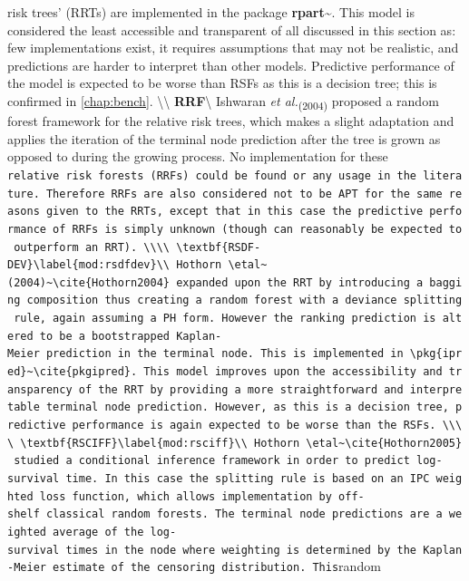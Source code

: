 \documentclass[
  letterpaper,
]{scrbook}
\theoremstyle{plain}
\theoremstyle{definition}
\theoremstyle{remark}
\begin{document}
risk trees' (RRTs) are implemented in the package
\textbf{rpart}\textasciitilde{}\cite{pkgrpart}. This model is considered
the least accessible and transparent of all discussed in this section
as: few implementations exist, it requires assumptions that may not be
realistic, and predictions are harder to interpret than other models.
Predictive performance of the model is expected to be worse than RSFs as
this is a decision tree; this is confirmed in \ref{chap:bench}.
\textbackslash\textbackslash{}
\textbf{RRF}\label{mod:rrf}\textbackslash{} Ishwaran
\textit{et al.}\textsubscript{(2004)}\cite{Ishwaran2004} proposed a
random forest framework for the relative risk trees, which makes a
slight adaptation and applies the iteration of the terminal node
prediction after the tree is grown as opposed to during the growing
process. No implementation for these
\texttt{relative\ risk\ forests\textquotesingle{}\ (RRFs)\ could\ be\ found\ or\ any\ usage\ in\ the\ literature.\ Therefore\ RRFs\ are\ also\ considered\ not\ to\ be\ APT\ for\ the\ same\ reasons\ given\ to\ the\ RRTs,\ except\ that\ in\ this\ case\ the\ predictive\ performance\ of\ RRFs\ is\ simply\ unknown\ (though\ can\ reasonably\ be\ expected\ to\ outperform\ an\ RRT).\ \textbackslash{}\textbackslash{}\textbackslash{}\textbackslash{}\ \textbackslash{}textbf\{RSDF-DEV\}\textbackslash{}label\{mod:rsdfdev\}\textbackslash{}\textbackslash{}\ Hothorn\ \textbackslash{}etal\textasciitilde{}(2004)\textasciitilde{}\textbackslash{}cite\{Hothorn2004\}\ expanded\ upon\ the\ RRT\ by\ introducing\ a\ bagging\ composition\ thus\ creating\ a\ random\ forest\ with\ a\ deviance\ splitting\ rule,\ again\ assuming\ a\ PH\ form.\ However\ the\ ranking\ prediction\ is\ altered\ to\ be\ a\ bootstrapped\ Kaplan-Meier\ prediction\ in\ the\ terminal\ node.\ This\ is\ implemented\ in\ \textbackslash{}pkg\{ipred\}\textasciitilde{}\textbackslash{}cite\{pkgipred\}.\ This\ model\ improves\ upon\ the\ accessibility\ and\ transparency\ of\ the\ RRT\ by\ providing\ a\ more\ straightforward\ and\ interpretable\ terminal\ node\ prediction.\ However,\ as\ this\ is\ a\ decision\ tree,\ predictive\ performance\ is\ again\ expected\ to\ be\ worse\ than\ the\ RSFs.\ \textbackslash{}\textbackslash{}\textbackslash{}\textbackslash{}\ \textbackslash{}textbf\{RSCIFF\}\textbackslash{}label\{mod:rsciff\}\textbackslash{}\textbackslash{}\ Hothorn\ \textbackslash{}etal\textasciitilde{}\textbackslash{}cite\{Hothorn2005\}\ studied\ a\ conditional\ inference\ framework\ in\ order\ to\ predict\ log-survival\ time.\ In\ this\ case\ the\ splitting\ rule\ is\ based\ on\ an\ IPC\ weighted\ loss\ function,\ which\ allows\ implementation\ by\ off-shelf\ classical\ random\ forests.\ The\ terminal\ node\ predictions\ are\ a\ weighted\ average\ of\ the\ log-survival\ times\ in\ the\ node\ where\ weighting\ is\ determined\ by\ the\ Kaplan-Meier\ estimate\ of\ the\ censoring\ distribution.\ This}random
\end{document}
